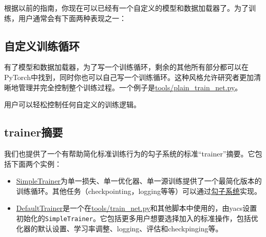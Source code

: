 \documentclass[../main.tex]{subfile}
\begin{document}
根据以前的指南，你现在可以已经有一个自定义的模型和数据加载器了。为了训练，用户通常会有下面两种表现之一：

\subsection{自定义训练循环}

有了模型和数据加载器，为了写一个训练循环，剩余的其他所有部分都可以在PyTorch中找到，同时你也可以自己写一个训练循环。这种风格允许研究者更加清晰地管理并完全控制整个训练过程。一个例子是\href{https://github.com/facebookresearch/detectron2/blob/master/tools/plain_train_net.py}{tools/plain\_train\_net.py}。

用户可以轻松控制任何自定义的训练逻辑。

\subsection{trainer摘要}

我们也提供了一个有帮助简化标准训练行为的勾子系统的标准“trainer”摘要。它包括下面两个实例：

\begin{itemize}
    \item \href{https://detectron2.readthedocs.io/en/latest/modules/engine.html#detectron2.engine.SimpleTrainer}{SimpleTrainer}为单一损失、单一优化器、单一源训练提供了一个最简化版本的训练循环。其他任务（checkpointing，logging等等）可以通过\href{https://detectron2.readthedocs.io/en/latest/modules/engine.html#detectron2.engine.HookBase}{勾子系统}实现。
    \item \href{https://detectron2.readthedocs.io/en/latest/modules/engine.html#detectron2.engine.defaults.DefaultTrainer}{DefaultTrainer}是一个在\href{https://github.com/facebookresearch/detectron2/blob/master/tools/train_net.py}{tools/train\_net.py}和其他脚本中使用的，由yacs设置初始化的\lstinline{SimpleTrainer}。它包括更多用户想要选择加入的标准操作，包括优化器的默认设置、学习率调整、logging、评估和checkpinging等。
\end{itemize}
\end{document}
